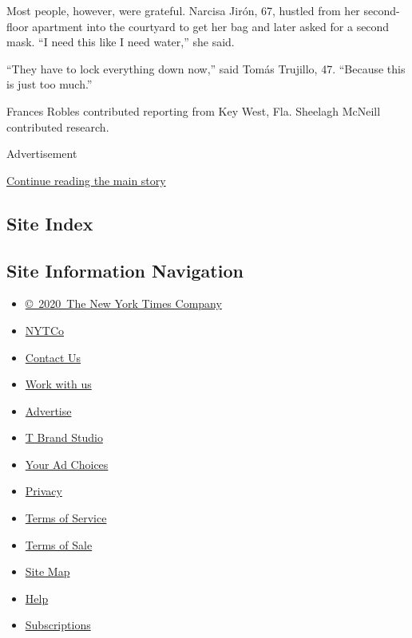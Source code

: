 Most people, however, were grateful. Narcisa Jirón, 67, hustled from her
second-floor apartment into the courtyard to get her bag and later asked
for a second mask. ``I need this like I need water,'' she said.

``They have to lock everything down now,'' said Tomás Trujillo, 47.
``Because this is just too much.''

Frances Robles contributed reporting from Key West, Fla. Sheelagh
McNeill contributed research.

Advertisement

\protect\hyperlink{after-bottom}{Continue reading the main story}

\hypertarget{site-index}{%
\subsection{Site Index}\label{site-index}}

\hypertarget{site-information-navigation}{%
\subsection{Site Information
Navigation}\label{site-information-navigation}}

\begin{itemize}
\tightlist
\item
  \href{https://help.nytimes.com/hc/en-us/articles/115014792127-Copyright-notice}{©~2020~The
  New York Times Company}
\end{itemize}

\begin{itemize}
\tightlist
\item
  \href{https://www.nytco.com/}{NYTCo}
\item
  \href{https://help.nytimes.com/hc/en-us/articles/115015385887-Contact-Us}{Contact
  Us}
\item
  \href{https://www.nytco.com/careers/}{Work with us}
\item
  \href{https://nytmediakit.com/}{Advertise}
\item
  \href{http://www.tbrandstudio.com/}{T Brand Studio}
\item
  \href{https://www.nytimes.com/privacy/cookie-policy\#how-do-i-manage-trackers}{Your
  Ad Choices}
\item
  \href{https://www.nytimes.com/privacy}{Privacy}
\item
  \href{https://help.nytimes.com/hc/en-us/articles/115014893428-Terms-of-service}{Terms
  of Service}
\item
  \href{https://help.nytimes.com/hc/en-us/articles/115014893968-Terms-of-sale}{Terms
  of Sale}
\item
  \href{https://spiderbites.nytimes.com}{Site Map}
\item
  \href{https://help.nytimes.com/hc/en-us}{Help}
\item
  \href{https://www.nytimes.com/subscription?campaignId=37WXW}{Subscriptions}
\end{itemize}
